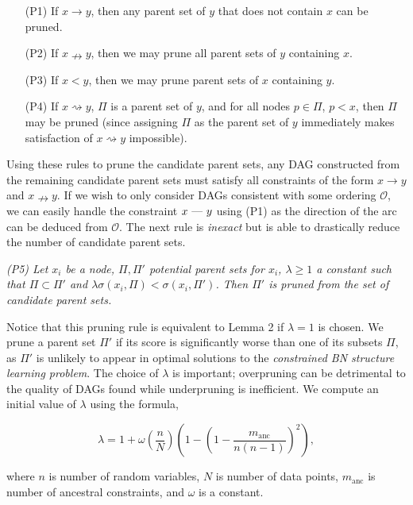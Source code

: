 \documentclass[twoside,11pt]{article}
\begin{document}
\begin{itemize}
\itemsep0em
\item[(P1)] If $x \rightarrow y$, then any parent set of $y$ that does not contain $x$ can be pruned.

\item[(P2)] If $x \nrightarrow y$, then we may prune all parent sets of $y$ containing $x$.

\item[(P3)] If $x < y$, then we may prune parent sets of $x$ containing $y$.
	
\item[(P4)] If $x \rightsquigarrow y$, $\Pi$ is a parent set of $y$, and for all nodes $p \in \Pi$, $p < x$, then $\Pi$ may be pruned (since assigning $\Pi$ as the parent set of $y$ immediately makes satisfaction of $x \rightsquigarrow y$ impossible).

\end{itemize}

Using these rules to prune the candidate parent sets, any DAG constructed from the remaining candidate parent sets must satisfy 
all constraints of the form $x \rightarrow y$ and $x \nrightarrow y$. If we wish to only consider DAGs consistent with some ordering $\mathcal{O}$, 
we can easily handle the constraint $x \text{ \textemdash \  } y$ using (P1) as the direction of the arc can be deduced from $\mathcal{O}$. 
The next rule is \emph{inexact} but is able to drastically reduce the number of candidate parent sets.

\smallskip
\noindent
\emph{
\emph{(P5)} Let $x_i$ be a node, $\Pi, \Pi'$ potential parent sets for $x_i$, $\lambda \ge 1$ a constant such that 
$\Pi \subset \Pi'$ and $\lambda \sigma(x_i, \Pi) <  \sigma(x_i, \Pi')$. Then $\Pi'$ is
pruned from the set of candidate parent sets.
}

\medskip
Notice that this pruning rule is equivalent to Lemma 2 if $\lambda = 1$ is chosen. We prune a parent set $\Pi'$ if its score is significantly 
worse than one of its subsets $\Pi$, as $\Pi'$ is unlikely to appear in
optimal solutions to the \emph{constrained BN structure learning problem}. The choice of $\lambda$ is important; overpruning can be detrimental to the quality of DAGs found while underpruning is inefficient. We compute an initial value of $\lambda$ using the formula,

$$\lambda = 1 + \omega (\frac{n}{N})(1 - (1 - \frac{m_{\text{anc}}}{n(n-1)})^2),$$

\noindent
where $n$ is number of random variables, $N$ is number of data points, $m_{\text{anc}}$ is number of 
ancestral constraints, and $\omega$ is a constant.
\end{document}
